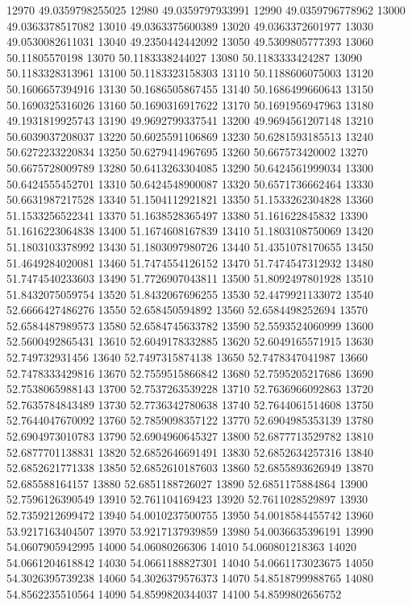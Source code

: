 {12970 49.0359798255025
12980 49.0359797933991
12990 49.0359796778962
13000 49.0363378517082
13010 49.0363375600389
13020 49.0363372601977
13030 49.0530082611031
13040 49.2350442442092
13050 49.5309805777393
13060 50.11805570198
13070 50.1183338244027
13080 50.1183333424287
13090 50.1183328313961
13100 50.1183323158303
13110 50.1188606075003
13120 50.1606657394916
13130 50.1686505867455
13140 50.1686499660643
13150 50.1690325316026
13160 50.1690316917622
13170 50.1691956947963
13180 49.1931819925743
13190 49.9692799337541
13200 49.9694561207148
13210 50.6039037208037
13220 50.6025591106869
13230 50.6281593185513
13240 50.6272233220834
13250 50.6279414967695
13260 50.667573420002
13270 50.6675728009789
13280 50.6413263304085
13290 50.6424561999034
13300 50.6424555452701
13310 50.6424548900087
13320 50.6571736662464
13330 50.6631987217528
13340 51.1504112921821
13350 51.1533262304828
13360 51.1533256522341
13370 51.1638528365497
13380 51.161622845832
13390 51.1616223064838
13400 51.1674608167839
13410 51.1803108750069
13420 51.1803103378992
13430 51.1803097980726
13440 51.4351078170655
13450 51.4649284020081
13460 51.7474554126152
13470 51.7474547312932
13480 51.7474540233603
13490 51.7726907043811
13500 51.8092497801928
13510 51.8432075059754
13520 51.8432067696255
13530 52.4479921133072
13540 52.6666427486276
13550 52.658450594892
13560 52.6584498252694
13570 52.6584487989573
13580 52.6584745633782
13590 52.5593524060999
13600 52.5600492865431
13610 52.6049178332885
13620 52.6049165571915
13630 52.749732931456
13640 52.7497315874138
13650 52.7478347041987
13660 52.7478333429816
13670 52.7559515866842
13680 52.7595205217686
13690 52.7538065988143
13700 52.7537263539228
13710 52.7636966092863
13720 52.7635784843489
13730 52.7736342780638
13740 52.7644061514608
13750 52.7644047670092
13760 52.7859098357122
13770 52.6904985353139
13780 52.6904973010783
13790 52.6904960645327
13800 52.6877713529782
13810 52.6877701138831
13820 52.6852646691491
13830 52.6852634257316
13840 52.6852621771338
13850 52.6852610187603
13860 52.6855893626949
13870 52.685588164157
13880 52.6851188726027
13890 52.6851175884864
13900 52.7596126390549
13910 52.761104169423
13920 52.7611028529897
13930 52.7359212699472
13940 54.0010237500755
13950 54.0018584455742
13960 53.9217163404507
13970 53.9217137939859
13980 54.0036635396191
13990 54.0607905942995
14000 54.06080266306
14010 54.060801218363
14020 54.0661204618842
14030 54.0661188827301
14040 54.0661173023675
14050 54.3026395739238
14060 54.3026379576373
14070 54.8518799988765
14080 54.8562235510564
14090 54.8599820344037
14100 54.8599802656752
}
